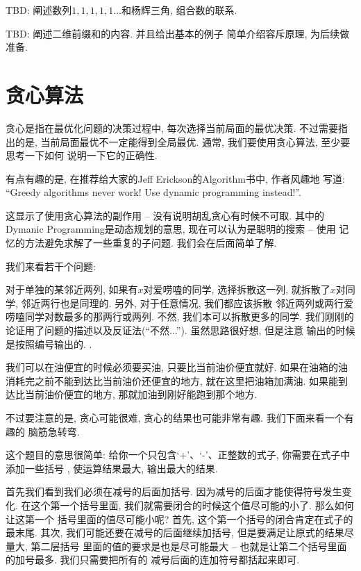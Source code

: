  TBD: 阐述数列$1,1,1,1,1...$和杨辉三角, 组合数的联系.

 TBD: 阐述二维前缀和的内容. 并且给出基本的例子
简单介绍容斥原理, 为后续做准备. 

\section{贪心算法}

贪心是指在最优化问题的决策过程中, 每次选择当前局面的最优决策. 不过需要指出的是, 
当前局面最优不一定能得到全局最优. 通常, 我们要使用贪心算法, 至少要思考一下如何
说明一下它的正确性. 

\begin{remark}
    有点有趣的是, 在推荐给大家的Jeff Erickson的Algorithm书中, 作者风趣地
    写道: ``Greedy algorithms never work! Use dynamic programming instead!''.

    这显示了使用贪心算法的副作用 -- 没有说明胡乱贪心有时候不可取. 其中的 
    Dymanic Programming是动态规划的意思, 现在可以认为是聪明的搜索 -- 使用
    记忆的方法避免求解了一些重复的子问题. 我们会在后面简单了解. 
\end{remark}

我们来看若干个问题: 

 对于单独的某邻近两列, 如果有$x$对爱唠嗑的同学, 选择拆散这一列, 
就拆散了$x$对同学, 邻近两行也是同理的. 另外, 对于任意情况, 我们都应该拆散
邻近两列或两行爱唠嗑同学对数最多的那两行或两列. 不然, 我们本可以拆散更多的同学. 
我们刚刚的论证用了问题的描述以及反证法(``不然...''). 虽然思路很好想, 但是注意
输出的时候是按照编号输出的. . 

 我们可以在油便宜的时候必须要买油, 只要比当前油价便宜就好. 
如果在油箱的油消耗完之前不能到达比当前油价还便宜的地方, 就在这里把油箱加满油. 
如果能到达比当前油价便宜的地方, 那就加油到刚好能跑到那个地方. 



不过要注意的是, 贪心可能很难, 贪心的结果也可能非常有趣. 我们下面来看一个有趣的
脑筋急转弯. 

这个题目的意思很简单: 给你一个只包含`+'、`-'、正整数的式子, 你需要在式子中添加一些括号
, 使运算结果最大, 输出最大的结果. 

首先我们看到我们必须在减号的后面加括号. 因为减号的后面才能使得符号发生变化. 
在这个第一个括号里面, 我们就需要闭合的时候这个值尽可能的小了. 那么如何让这第一个
括号里面的值尽可能小呢? 首先, 这个第一个括号的闭合肯定在式子的最末尾. 
其次, 我们可能还要在减号的后面继续加括号, 但是要满足让原式的结果尽量大, 第二层括号
里面的值的要求是也是尽可能最大 -- 也就是让第二个括号里面的加号最多. 我们只需要把所有的
减号后面的连加符号都括起来即可. 

